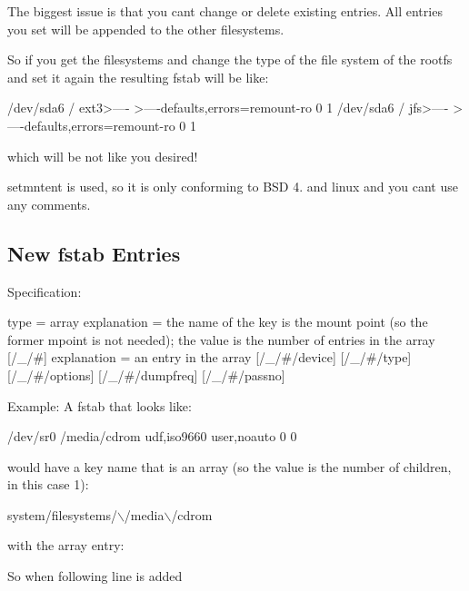 The biggest issue is that you can\textquotesingle{}t change or delete existing entries. All entries you set will be appended to the other filesystems.

So if you get the filesystems and change the type of the file system of the rootfs and set it again the resulting fstab will be like\+:


\begin{DoxyCode}
/dev/sda6       /               ext3>----   >----defaults,errors=remount-ro 0 1
/dev/sda6       /               jfs>----   >----defaults,errors=remount-ro 0 1
\end{DoxyCode}


which will be not like you desired!

setmntent is used, so it is only conforming to B\+SD 4. and linux and you can\textquotesingle{}t use any comments.

\subsection*{New fstab Entries}

Specification\+:


\begin{DoxyCode}
[/\_]
type = array
explanation = the name of the key is the mount point (so the former
  mpoint is not needed); the value is the number of entries in the
  array
[/\_/#]
explanation = an entry in the array
[/\_/#/device]
[/\_/#/type]
[/\_/#/options]
[/\_/#/dumpfreq]
[/\_/#/passno]
\end{DoxyCode}


Example\+: A fstab that looks like\+:


\begin{DoxyCode}
/dev/sr0        /media/cdrom   udf,iso9660 user,noauto     0       0
\end{DoxyCode}


would have a key name that is an array (so the value is the number of children, in this case 1)\+:


\begin{DoxyCode}
system/filesystems/\(\backslash\)/media\(\backslash\)/cdrom
\end{DoxyCode}


with the array entry\+:




So when following line is added


